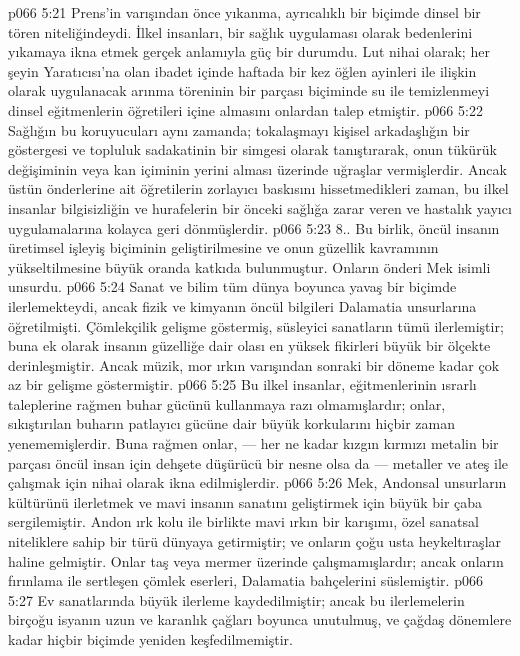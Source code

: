 \vs p066 5:21 Prens’in varışından önce yıkanma, ayrıcalıklı bir biçimde dinsel bir tören niteliğindeydi. İlkel insanları, bir sağlık uygulaması olarak bedenlerini yıkamaya ikna etmek gerçek anlamıyla güç bir durumdu. Lut nihai olarak; her şeyin Yaratıcısı’na olan ibadet içinde haftada bir kez öğlen ayinleri ile ilişkin olarak uygulanacak arınma töreninin bir parçası biçiminde su ile temizlenmeyi dinsel eğitmenlerin öğretileri içine almasını onlardan talep etmiştir.
\vs p066 5:22 Sağlığın bu koruyucuları aynı zamanda; tokalaşmayı kişisel arkadaşlığın bir göstergesi ve topluluk sadakatinin bir simgesi olarak tanıştırarak, onun tükürük değişiminin veya kan içiminin yerini alması üzerinde uğraşlar vermişlerdir. Ancak üstün önderlerine ait öğretilerin zorlayıcı baskısını hissetmedikleri zaman, bu ilkel insanlar bilgisizliğin ve hurafelerin bir önceki sağlığa zarar veren ve hastalık yayıcı uygulamalarına kolayca geri dönmüşlerdir.
\vs p066 5:23 8.. Bu birlik, öncül insanın üretimsel işleyiş biçiminin geliştirilmesine ve onun güzellik kavramının yükseltilmesine büyük oranda katkıda bulunmuştur. Onların önderi Mek isimli unsurdu.
\vs p066 5:24 Sanat ve bilim tüm dünya boyunca yavaş bir biçimde ilerlemekteydi, ancak fizik ve kimyanın öncül bilgileri Dalamatia unsurlarına öğretilmişti. Çömlekçilik gelişme göstermiş, süsleyici sanatların tümü ilerlemiştir; buna ek olarak insanın güzelliğe dair olası en yüksek fikirleri büyük bir ölçekte derinleşmiştir. Ancak müzik, mor ırkın varışından sonraki bir döneme kadar çok az bir gelişme göstermiştir.
\vs p066 5:25 Bu ilkel insanlar, eğitmenlerinin ısrarlı taleplerine rağmen buhar gücünü kullanmaya razı olmamışlardır; onlar, sıkıştırılan buharın patlayıcı gücüne dair büyük korkularını hiçbir zaman yenememişlerdir. Buna rağmen onlar, --- her ne kadar kızgın kırmızı metalin bir parçası öncül insan için dehşete düşürücü bir nesne olsa da --- metaller ve ateş ile çalışmak için nihai olarak ikna edilmişlerdir.
\vs p066 5:26 Mek, Andonsal unsurların kültürünü ilerletmek ve mavi insanın sanatını geliştirmek için büyük bir çaba sergilemiştir. Andon ırk kolu ile birlikte mavi ırkın bir karışımı, özel sanatsal niteliklere sahip bir türü dünyaya getirmiştir; ve onların çoğu usta heykeltıraşlar haline gelmiştir. Onlar taş veya mermer üzerinde çalışmamışlardır; ancak onların fırınlama ile sertleşen çömlek eserleri, Dalamatia bahçelerini süslemiştir.
\vs p066 5:27 Ev sanatlarında büyük ilerleme kaydedilmiştir; ancak bu ilerlemelerin birçoğu isyanın uzun ve karanlık çağları boyunca unutulmuş, ve çağdaş dönemlere kadar hiçbir biçimde yeniden keşfedilmemiştir.
